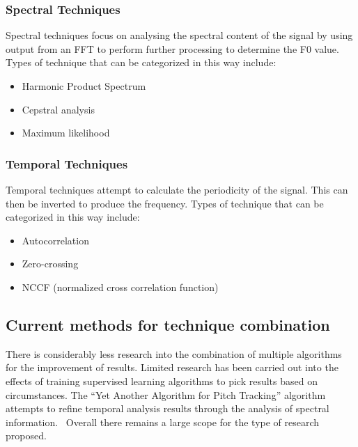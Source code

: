 \documentclass{scrartcl}
\begin{document}
    \subsubsection{Spectral Techniques}
    Spectral techniques focus on analysing the spectral content of the signal
    by using output from an FFT to perform further processing to determine the
    F0 value. Types of technique that can be categorized in this way include:
    \begin{itemize}
        \item Harmonic Product Spectrum~\parencite[p.8]{smyth2015hps}
        \item Cepstral analysis
        \item Maximum likelihood
    \end{itemize}
    \subsubsection{Temporal Techniques}
    Temporal techniques attempt to calculate the periodicity of the signal.
    This can then be inverted to produce the frequency.
    Types of technique that can be categorized in this way include:
    \begin{itemize}
        \item Autocorrelation~\parencite[p.98]{lerch2012itaca}
        \item Zero-crossing~\parencite[p.98]{lerch2012itaca}
        \item NCCF (normalized cross correlation function)~\parencite{kasi2015yaapt}
    \end{itemize}
    \subsection{Current methods for technique combination} 
    \label{sec:ComMeth}
    There is considerably less research into the combination of multiple
    algorithms for the improvement of results. Limited research has been
    carried out into the effects of training supervised learning algorithms to
    pick results based on circumstances.
    The ``Yet Another Algorithm for Pitch Tracking'' algorithm attempts to
    refine temporal analysis results through the analysis of spectral
    information.~\cite{kasi2015yaapt}
    Overall there remains a large scope for the type of research proposed.
\end{document}
